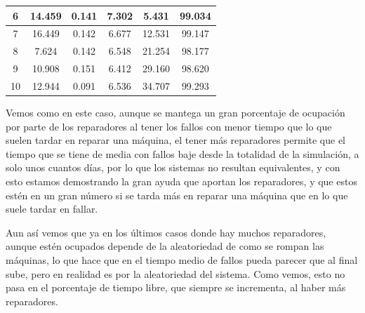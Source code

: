 \documentclass[12pt, spanish]{article}
\begin{document}
\begin{table}[H]
{\begin{tabular}{|c|c|c|c|c|c|}
6                       & 14.459                   & 0.141                          & 7.302                                                                               & 5.431                   & 99.034                                                                      \\ \hline
7                       & 16.449                   & 0.142                          & 6.677                                                                               & 12.531                  & 99.147                                                                      \\ \hline
8                       & 7.624                    & 0.142                          & 6.548                                                                               & 21.254                  & 98.177                                                                      \\ \hline
9                       & 10.908                   & 0.151                          & 6.412                                                                               & 29.160                  & 98.620                                                                      \\ \hline
10                      & 12.944                   & 0.091                          & 6.536                                                                               & 34.707                  & 99.293                                                                      \\ \hline
\end{tabular}%
}
\end{table}


Vemos como en este caso, aunque se mantega un gran porcentaje de ocupación por parte de los reparadores al tener los fallos con menor tiempo que lo que suelen tardar en reparar una máquina, el tener más reparadores permite que el tiempo que se tiene de media con fallos baje desde la totalidad de la simulación, a solo unos cuantos días, por lo que los sistemas no resultan equivalentes, y con esto estamos demostrando la gran ayuda que aportan los reparadores, y que estos estén en un gran número si se tarda más en reparar una máquina que en lo que suele tardar en fallar.

Aun así vemos que ya en los últimos casos donde hay muchos reparadores, aunque estén ocupados depende de la aleatoriedad de como se rompan las máquinas, lo que hace que en el tiempo medio de fallos pueda parecer que al final sube, pero en realidad es por la aleatoriedad del sistema. Como vemos, esto no pasa en el porcentaje de tiempo libre, que siempre se incrementa, al haber más reparadores.
\end{document}
